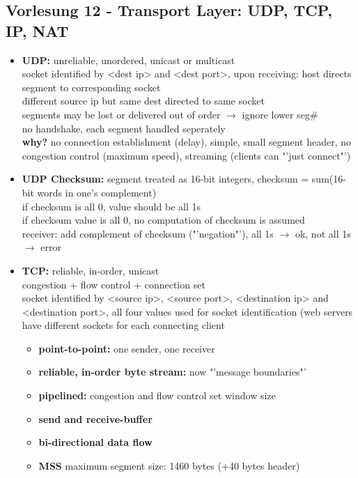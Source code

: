 \subsection*{Vorlesung 12 - Transport Layer: UDP, TCP, IP, NAT}
  \begin{itemize}
  \item \textbf{UDP:} unreliable, unordered, unicast or multicast \\
   socket identified by <dest ip> and <dest port>, upon receiving: host directs segment to corresponding socket \\ different source ip but same dest directed to same socket \\
   segments may be lost or delivered out of order $\to$ ignore lower seg\# \\
   no handshake, each segment handled seperately \\
   \textbf{why?} no connection establishment (delay), simple, small segment header, no congestion control (maximum speed), streaming (clients can "'just connect"')
  \item \textbf{UDP Checksum:} segment treated as 16-bit integers, checksum = sum(16-bit words in one's complement)\\
  if checksum is all 0, value should be all 1s\\
  if checksum value is all 0, no computation of checksum is assumed \\
  receiver: add complement of checksum ("'negation"'), all 1s $\to$ ok, not all 1s $\to$ error
  \item \textbf{TCP:} reliable, in-order, unicast \\
  congestion + flow control + connection set \\
   socket identified by <source ip>, <source port>, <destination ip> and <destination port>, all four values used for socket identification (web servers have different sockets for each connecting client \\
   \begin{itemize}
    \item \textbf{point-to-point:} one sender, one receiver
    \item \textbf{reliable, in-order byte stream:} now "'message boundaries"'
    \item \textbf{pipelined:} congestion and flow control set window size
    \item \textbf{send and receive-buffer}
    \item \textbf{bi-directional data flow}
    \item \textbf{MSS} maximum segment size: 1460 bytes (+40 bytes header)

\end{itemize}
\end{itemize}
